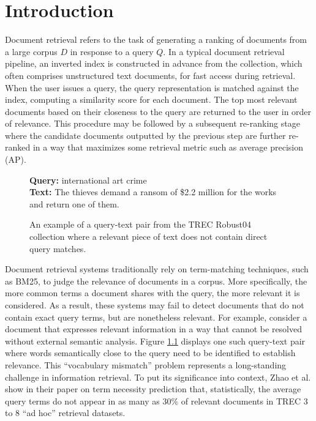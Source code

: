 \chapter{Introduction}
\label{intro}

Document retrieval refers to the task of generating a ranking of documents from a large corpus $ D $ in response to a query $ Q $.
In a typical document retrieval pipeline, an inverted index is constructed in advance from the collection, which often comprises unstructured text documents, for fast access during retrieval.
When the user issues a query, the query representation is matched against the index, computing a similarity score for each document.
The top most relevant documents based on their closeness to the query are returned to the user in order of relevance.
This procedure may be followed by a subsequent re-ranking stage where the candidate documents outputted by the previous step are further re-ranked in a way that maximizes some retrieval metric such as average precision (AP).

\begin{figure}[b!]
	\begin{framed}
		\centering
    		\textbf{Query:} international art crime \\
    		\textbf{Text:} The thieves demand a ransom of \$2.2 million for the works and return one of them.
	\end{framed}
\label{query-sent-example}
 \caption{An example of a query-text pair from the TREC Robust04 collection where a relevant piece of text does not contain direct query matches.}
\end{figure}

Document retrieval systems traditionally rely on term-matching techniques, such as BM25, to judge the relevance of documents in a corpus.
More specifically, the more common terms a document shares with the query, the more relevant it is considered.
As a result, these systems may fail to detect documents that do not contain exact query terms, but are nonetheless relevant.
For example, consider a document that expresses relevant information in a way that cannot be resolved without external semantic analysis.
Figure \ref{query-sent-example} displays one such query-text pair where words semantically close to the query need to be identified to establish relevance.
This ``vocabulary mismatch'' problem represents a long-standing challenge in information retrieval.
To put its significance into context, Zhao et al. \cite{zhao2010term} show in their paper on term necessity prediction that, statistically, the average query terms do not appear in as many as 30\% of relevant documents in TREC 3 to 8 ``ad hoc'' retrieval datasets.

